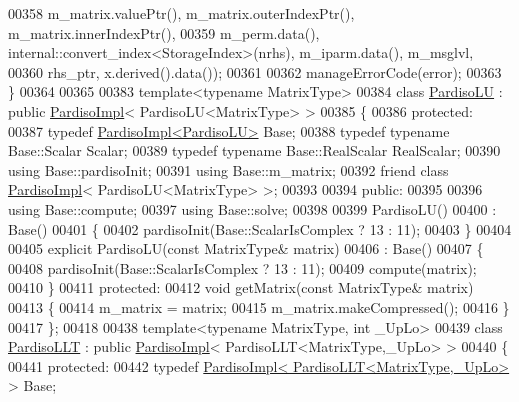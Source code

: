 \begin{DoxyCode}
00358                                                             m\_matrix.valuePtr(), m\_matrix.outerIndexPtr(), 
      m\_matrix.innerIndexPtr(),
00359                                                             m\_perm.data(), 
      internal::convert\_index<StorageIndex>(nrhs), m\_iparm.data(), m\_msglvl,
00360                                                             rhs\_ptr, x.derived().data());
00361 
00362   manageErrorCode(error);
00363 \}
00364 
00365 
00383 \textcolor{keyword}{template}<\textcolor{keyword}{typename} MatrixType>
00384 \textcolor{keyword}{class }\hyperlink{class_eigen_1_1_pardiso_l_u}{PardisoLU} : \textcolor{keyword}{public} \hyperlink{class_eigen_1_1_pardiso_impl}{PardisoImpl}< PardisoLU<MatrixType> >
00385 \{
00386   \textcolor{keyword}{protected}:
00387     \textcolor{keyword}{typedef} \hyperlink{class_eigen_1_1_pardiso_impl}{PardisoImpl<PardisoLU>} Base;
00388     \textcolor{keyword}{typedef} \textcolor{keyword}{typename} Base::Scalar Scalar;
00389     \textcolor{keyword}{typedef} \textcolor{keyword}{typename} Base::RealScalar RealScalar;
00390     \textcolor{keyword}{using} Base::pardisoInit;
00391     \textcolor{keyword}{using} Base::m\_matrix;
00392     \textcolor{keyword}{friend} \textcolor{keyword}{class }\hyperlink{class_eigen_1_1_pardiso_impl}{PardisoImpl}< PardisoLU<MatrixType> >;
00393 
00394   \textcolor{keyword}{public}:
00395 
00396     \textcolor{keyword}{using} Base::compute;
00397     \textcolor{keyword}{using} Base::solve;
00398 
00399     PardisoLU()
00400       : Base()
00401     \{
00402       pardisoInit(Base::ScalarIsComplex ? 13 : 11);
00403     \}
00404 
00405     \textcolor{keyword}{explicit} PardisoLU(\textcolor{keyword}{const} MatrixType& matrix)
00406       : Base()
00407     \{
00408       pardisoInit(Base::ScalarIsComplex ? 13 : 11);
00409       compute(matrix);
00410     \}
00411   \textcolor{keyword}{protected}:
00412     \textcolor{keywordtype}{void} getMatrix(\textcolor{keyword}{const} MatrixType& matrix)
00413     \{
00414       m\_matrix = matrix;
00415       m\_matrix.makeCompressed();
00416     \}
00417 \};
00418 
00438 \textcolor{keyword}{template}<\textcolor{keyword}{typename} MatrixType, \textcolor{keywordtype}{int} \_UpLo>
00439 \textcolor{keyword}{class }\hyperlink{class_eigen_1_1_pardiso_l_l_t}{PardisoLLT} : \textcolor{keyword}{public} \hyperlink{class_eigen_1_1_pardiso_impl}{PardisoImpl}< PardisoLLT<MatrixType,\_UpLo> >
00440 \{
00441   \textcolor{keyword}{protected}:
00442     \textcolor{keyword}{typedef} \hyperlink{class_eigen_1_1_pardiso_impl}{PardisoImpl< PardisoLLT<MatrixType,\_UpLo>} > Base;

\end{DoxyCode}
